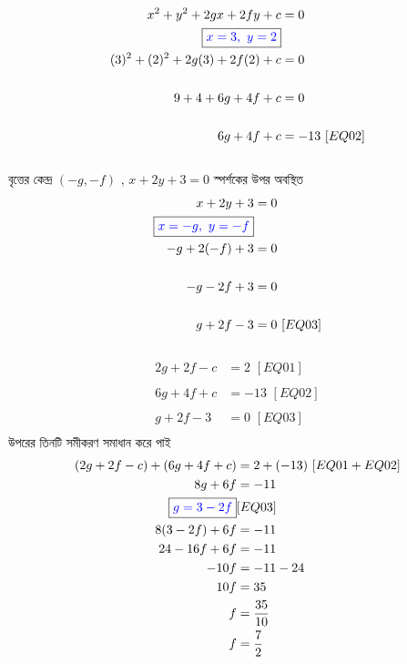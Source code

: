 \documentclass{article}
\begin{document}
	\\
	\begin{align*}
		x^2+y^2+2gx+2fy+c&=0\\
		\boxed{\textcolor{blue}{x=3,\,\,y=2}}&\\
		(3)^2+(2)^2+2g(3)+2f(2)+c&=0\\
		\\
		9+4+6g+4f+c&=0\\
		\\
		6g+4f+c&=-13\,\,[EQ02]\\
	\end{align*}
	\\
বৃত্তের কেন্দ্র	$(-g,-f)$ , $x+2y+3=0$ স্পর্শকের উপর অবস্থিত\\ 
	\begin{align*}
		x+2y+3&=0\\
		\boxed{\textcolor{blue}{x=-g,\,\,y=-f}}&\\
		-g+2(-f)+3&=0\\
		\\
		-g-2f+3&=0\\
		\\
		g+2f-3&=0\,\,[EQ03]\\
	\end{align*}
	\\
	\begin{align*}
		2g+2f-c&=2\,\,[EQ01]\\
		\\
		6g+4f+c&=-13\,\,[EQ02]\\
		\\
		g+2f-3&=0\,\,[EQ03]\\
	\end{align*}
উপরের তিনটি সমীকরণ সমাধান করে পাই\\ 
\begin{align*}
	(2g+2f-c)+(	6g+4f+c)&=2+(-13)\,\,[EQ01+EQ02]\\
	8g+6f&=-11\\
\boxed{\textcolor{blue}{g=3-2f}}&[EQ03]\\
	8(3-2f)+6f&=-11\\
	24-16f+6f&=-11\\
	-10f&=-11-24\\
	10f&=35\\
	f&=\frac{35}{10}\\
	f&=\frac{7}{2}
\end{align*}
\vspace{3cm}
\end{document}
